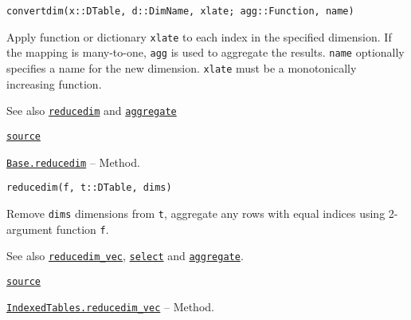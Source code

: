 \documentclass{memoir}
\begin{document}
\begin{adjustwidth}{2em}{0pt}


\begin{lstlisting}
convertdim(x::DTable, d::DimName, xlate; agg::Function, name)
\end{lstlisting}

Apply function or dictionary \texttt{xlate} to each index in the specified dimension. If the mapping is many-to-one, \texttt{agg} is used to aggregate the results. \texttt{name} optionally specifies a name for the new dimension. \texttt{xlate} must be a monotonically increasing function.

See also \href{apireference.html\#Base.reducedim-Tuple\{Any,JuliaDB.DTable,Any\}}{\texttt{reducedim}} and \href{apireference.html\#IndexedTables.aggregate-Tuple\{Any,JuliaDB.DTable\}}{\texttt{aggregate}}



\href{https://github.com/JuliaComputing/JuliaDB.jl/tree/9e65f8c3b0e9c2e27c3334a093a5aefc6c7d1246/src/query.jl#L88-L97}{\texttt{source}}


\end{adjustwidth}
\hypertarget{13741711985829965096}{} 
\hyperlink{13741711985829965096}{\texttt{Base.reducedim}}  -- {Method.}

\begin{adjustwidth}{2em}{0pt}


\begin{lstlisting}
reducedim(f, t::DTable, dims)
\end{lstlisting}

Remove \texttt{dims} dimensions from \texttt{t}, aggregate any rows with equal indices using 2-argument function \texttt{f}.

See also \href{apireference.html\#IndexedTables.reducedim\_vec-Tuple\{Any,JuliaDB.DTable,Any\}}{\texttt{reducedim\_vec}}, \href{apireference.html\#Base.Sort.select-Tuple\{JuliaDB.DTable,Vararg\{Pair,N\}\}}{\texttt{select}} and \href{apireference.html\#IndexedTables.aggregate-Tuple\{Any,JuliaDB.DTable\}}{\texttt{aggregate}}.



\href{https://github.com/JuliaComputing/JuliaDB.jl/tree/9e65f8c3b0e9c2e27c3334a093a5aefc6c7d1246/src/query.jl#L135-L142}{\texttt{source}}


\end{adjustwidth}
\hypertarget{12223450234186551969}{} 
\hyperlink{12223450234186551969}{\texttt{IndexedTables.reducedim\_vec}}  -- {Method.}
\end{document}
